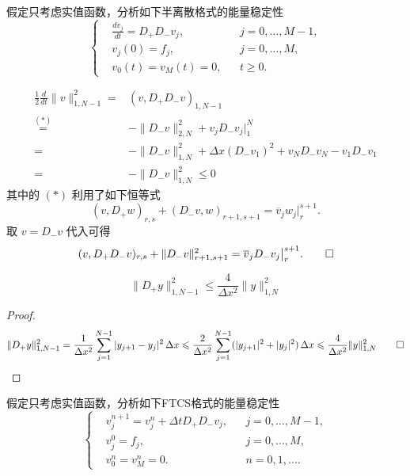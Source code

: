 \begin{example}
    假定只考虑实值函数，分析如下半离散格式的能量稳定性
    \[
        \left\{
        \begin{aligned}
             & \frac{d v_j}{d t} = D_+ D_- v_j, &  & j=0,\dots,M-1, \\
             & v_j(0) = f_j,                    &  & j=0,\dots,M,   \\
             & v_0(t) = v_M(t) = 0,             &  & t \ge 0.
        \end{aligned}
        \right.
    \]
\end{example}

\begin{solution*}
    \begin{align*}
        \frac12 \frac{d}{dt} \|v\|_{1,N-1}^2
        ={}                & \left( v,D_+ D_- v \right)_{1,N-1}                                      \\
        \overset{(*)}{=}{} & - \| D_- v\|_{2,N}^2 + v_j D_- v_j \big|_1^N                            \\
        ={}                & - \| D_- v\|_{1,N}^2 + \Delta x (D_- v_1)^2 + v_N D_- v_N - v_1 D_- v_1 \\
        ={}                & - \| D_- v\|_{1,N}^2 \le 0
    \end{align*}
    其中的 $(*)$ 利用了如下恒等式
    \[
        (v,D_+ w)_{r,s} + (D_- v, w)_{r+1,s+1} = \overline{v}_j w_j \big|_r^{s+1}.
    \]
    取 $v = D_- v$ 代入可得
    \[
        (v, D_+ D_- v)_{r,s} + \|D_- v\|^2_{r+1,s+1} = \overline{v}_j D_- v_j \big|_r^{s+1}. \qedhere
    \]
\end{solution*}

\begin{lemma}\label{lemma:ib-1}
    \[
        \| D_+ y \|_{1,N-1}^2 \le \frac{4}{\Delta x^2} \| y \|_{1,N}^2
    \]
\end{lemma}

\begin{proof}
    \[
        \| D_+ y \|_{1,N-1}^2
        =  \frac{1}{\Delta x^2} \sum_{j=1}^{N-1} |y_{j+1} - y_j|^2\, \Delta x
        \le \frac{2}{\Delta x^2} \sum_{j=1}^{N-1}(|y_{j+1}|^2 + |y_j|^2)\, \Delta x
        \le \frac{4}{\Delta x^2} \| y \|_{1,N}^2 \qedhere
    \]
\end{proof}

\begin{example}
    假定只考虑实值函数，分析如下FTCS格式的能量稳定性
    \[
        \left\{
        \begin{aligned}
             & v_j^{n+1} = v_j^n + \Delta t D_+D_- v_j, &  & j=0,\dots,M-1, \\
             & v_j^0 = f_j,                             &  & j=0,\dots,M,   \\
             & v_0^n = v_M^n = 0.                       &  & n=0,1,\dots.
        \end{aligned}
        \right.
    \]
\end{example}

